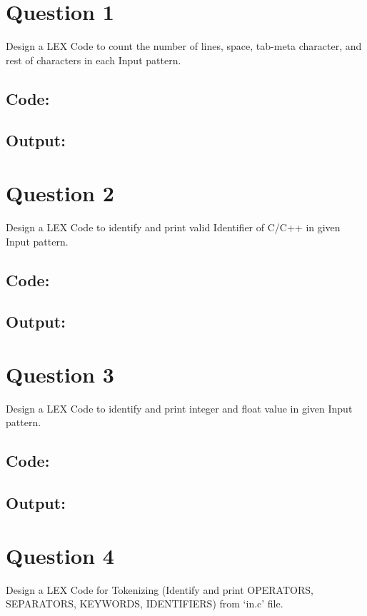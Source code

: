 \documentclass{article}
\begin{document}
\newpage
\section*{Question 1}
Design a LEX Code to count the number of lines, space, 
tab-meta character, and rest of characters in each Input 
pattern. 
\subsection*{Code:}

\subsection*{Output:}


\newpage
\section*{Question 2}
Design a LEX Code to identify and print valid Identifier of 
C/C++ in given Input pattern. 
\subsection*{Code:}

\subsection*{Output:}


\newpage
\section*{Question 3}
Design a LEX Code to identify and print integer and float 
value in given Input pattern.
\subsection*{Code:}

\subsection*{Output:}


\newpage
\section*{Question 4}
Design a LEX Code for Tokenizing 
(Identify and print OPERATORS, SEPARATORS, KEYWORDS, 
IDENTIFIERS)  from `in.c' file.
\end{document}
